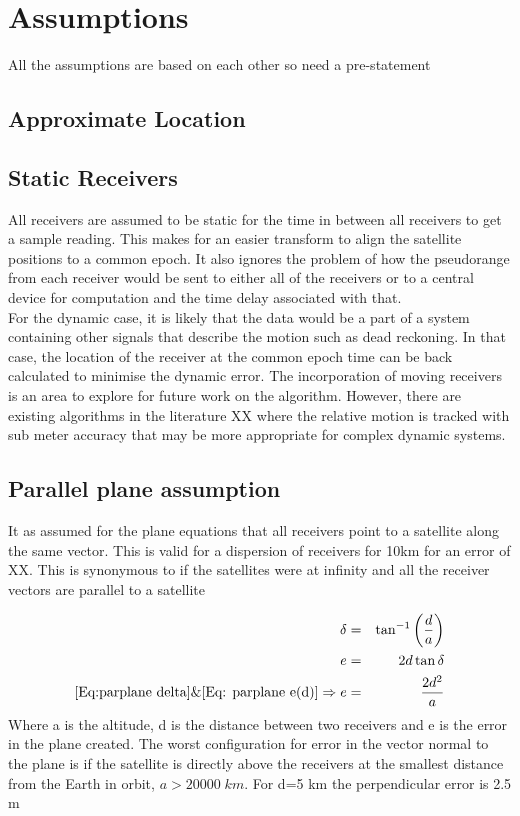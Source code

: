 
\section{Assumptions}
All the assumptions are based on each other so need a pre-statement
\subsection{Approximate Location}



\subsection{Static Receivers}
All receivers are assumed to be static for the time in between all receivers to get a sample reading. This makes for an easier transform to align the satellite positions to a common epoch. It also ignores the problem of how the pseudorange from each receiver would be sent to either all of the receivers or to a central device for computation and the time delay associated with that. \\

For the dynamic case, it is likely that the data would be a part of a system containing other signals that describe the motion such as dead reckoning. In that case, the location of the receiver at the common epoch time can be back calculated to minimise the dynamic error. The incorporation of moving receivers is an area to explore for future work on the algorithm. However, there are existing algorithms in the literature XX where the relative motion is tracked with sub meter accuracy that may be more appropriate for complex dynamic systems.


\subsection{Parallel plane assumption}
It as assumed for the plane equations that all receivers point to a satellite along the same vector. This is valid for a dispersion of receivers for 10km for an error of XX. This is synonymous to if the satellites were at infinity and all the receiver vectors are parallel to a satellite



\begin{eqnarray}
\delta &=& \tan^{-1}\left(\frac{d}{a}\right) \label{Eq:parplane delta}\\
e &=& 2d\tan\delta \label{Eq: parplane e(d)}\\
\eqref{Eq:parplane delta} \& \eqref{Eq: parplane e(d)}\Rightarrow e&=&\frac{2d^2}{a}
\end{eqnarray}
Where a is the altitude, d is the distance between two receivers and e is the error in the plane created. The worst configuration for error in the vector normal to the plane is if the satellite is directly above the receivers at the smallest distance from the Earth in orbit, $a>20000\;km$. For d=5 km the perpendicular error is 2.5 m





